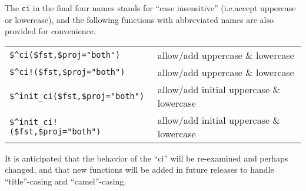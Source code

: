 \vspace{0.5cm}

The \texttt{ci} in the final four names stands for ``case insensitive''
(i.e.\@ accept uppercase or lowercase), and the following functions with
abbreviated names are also provided for convenience.

\vspace{0.5cm}

\noindent
\begin{tabular}{|l|l|}
\hline
\verb/$^ci($fst,/\verb!$proj="both"!\verb!)! & allow/add uppercase \& lowercase\\
\verb/$^ci!($fst,/\verb!$proj="both"!\verb!)! & allow/add uppercase \& lowercase\\
\verb/$^init_ci($fst,/\verb!$proj="both"!\verb!)! & allow/add initial uppercase \& lowercase\\
\verb/$^init_ci!($fst,/\verb!$proj="both"!\verb!)! & allow/add initial uppercase \& lowercase\\
\hline
\end{tabular}

\vspace{0.5cm}

It is anticipated that the behavior of the ``ci'' will be re-examined and
perhaps changed, and that new functions will be added in future releases
to handle ``title''-casing and ``camel''-casing.

